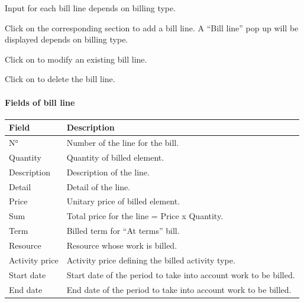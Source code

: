\documentclass[letterpaper,10pt,english]{sphinxmanual}
\begin{document}
Input for each bill line depends on billing type.

Click on  the corresponding section to add a bill line. A “Bill line” pop up will be displayed depends on billing type.

Click on  to modify an existing bill line.

Click on  to delete the bill line.
\paragraph{Fields of bill line}

\begin{tabulary}{\linewidth}{|l|l|}
\hline
\textsf{\relax 
Field
} & \textsf{\relax 
Description
}\\
\hline
N°
 & 
Number of the line for the bill.
\\
\hline
Quantity
 & 
Quantity of billed element.
\\
\hline
Description
 & 
Description of the line.
\\
\hline
Detail
 & 
Detail of the line.
\\
\hline
Price
 & 
Unitary price of billed element.
\\
\hline
Sum
 & 
Total price for the line = Price x Quantity.
\\
\hline
Term
 & 
Billed term for “At terms” bill.
\\
\hline
Resource
 & 
Resource whose work is billed.
\\
\hline
Activity price
 & 
Activity price defining the billed activity type.
\\
\hline
Start date
 & 
Start date of the period to take into account work to be billed.
\\
\hline
End date
 & 
End date of the period to take into account work to be billed.
\\
\hline\end{tabulary}
\end{document}
